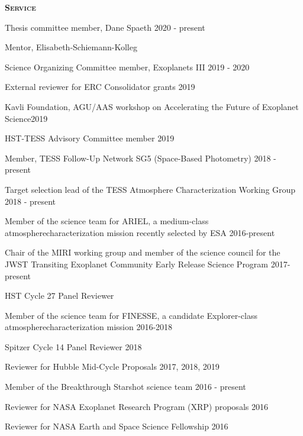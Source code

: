 \documentclass[12pt,letterpaper]{article}
\begin{document}
\textbf{\textsc{Service}} 
\begin{compactitem}[]
\item {Thesis committee member, Dane Spaeth \hfill 2020 -  present}
\item{Mentor, Elisabeth-Schiemann-Kolleg}
\item {Science Organizing Committee member, Exoplanets III \hfill 2019 - 2020}
\item {External reviewer for ERC Consolidator grants \hfill 2019}
\item {Kavli Foundation, AGU/AAS workshop on Accelerating the Future of Exoplanet Science\hfill 2019}
\item {HST-TESS Advisory Committee member \hfill 2019}
\item {Member, TESS Follow-Up Network SG5 (Space-Based Photometry) \hfill 2018 - present}
\item {Target selection lead of the TESS Atmosphere Characterization Working Group \hfill 2018 - present}	
\item {Member of the science team for ARIEL, a medium-class atmosphere\newline characterization mission recently selected by ESA \hfill 2016-present}
\item {Chair of the MIRI working group and member of the science council for the \newline JWST Transiting Exoplanet Community Early Release Science Program \hfill 2017- present}
\item{HST Cycle 27 Panel Reviewer}
\item {Member of the science team for FINESSE, a candidate Explorer-class atmosphere\newline characterization mission \hfill 2016-2018}
\item {Spitzer Cycle 14 Panel Reviewer \hfill 2018}
\item {Reviewer for Hubble Mid-Cycle Proposals \hfill 2017, 2018, 2019}
\item {Member of the Breakthrough Starshot science team \hfill 2016 - present}
\item Reviewer for NASA Exoplanet Research Program (XRP) proposals \hfill	2016
\item Reviewer for NASA Earth and Space Science Fellowship \hfill 2016

\end{compactitem}
\end{document}
